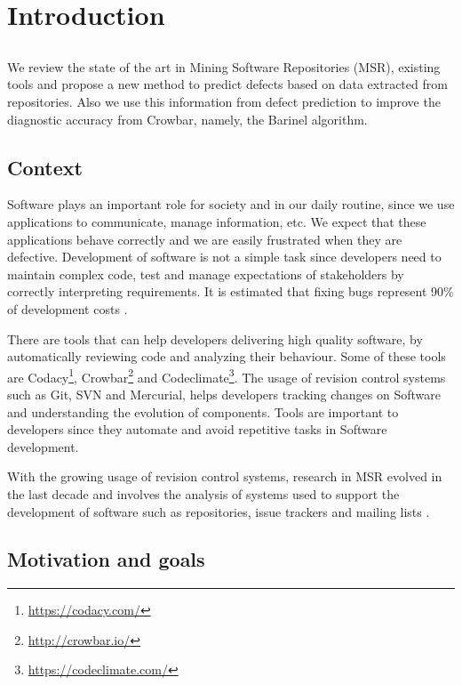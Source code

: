 \chapter{Introduction} \label{chap:intro}

\section*{}
We review the state of the art in Mining Software Repositories (MSR),
existing tools and propose a new method to predict defects based on data
extracted from repositories. Also we use this information from defect
prediction to improve the diagnostic accuracy from Crowbar, namely,
the Barinel algorithm.

\section{Context} \label{sec:context}
Software plays an important role for society and in our daily routine, since
we use applications to communicate, manage information, etc. We expect that
these applications behave correctly and we are easily frustrated when they
are defective. Development of software is not a simple task since developers
need to maintain complex code, test and manage expectations of stakeholders
by correctly interpreting requirements. It is estimated that fixing bugs
represent 90\% of development costs \cite{Servant1}.

There are tools that can help developers delivering high quality software,
by automatically reviewing code and analyzing their behaviour. Some of
these tools are Codacy\footnote{\url{https://codacy.com/}},
Crowbar\footnote{\url{http://crowbar.io/}} and
Codeclimate\footnote{\url{https://codeclimate.com/}}. The usage of revision
control systems such as Git, SVN and Mercurial, helps developers tracking
changes on Software and understanding the evolution of components. Tools are
important to developers since they automate and avoid repetitive tasks in
Software development.

With the growing usage of revision control systems, research in MSR evolved
in the last decade and involves the analysis of systems used to support
the development of software such as repositories, issue trackers and
mailing lists \cite{Hemmati2013}.

\section{Motivation and goals} \label{sec:goals}

